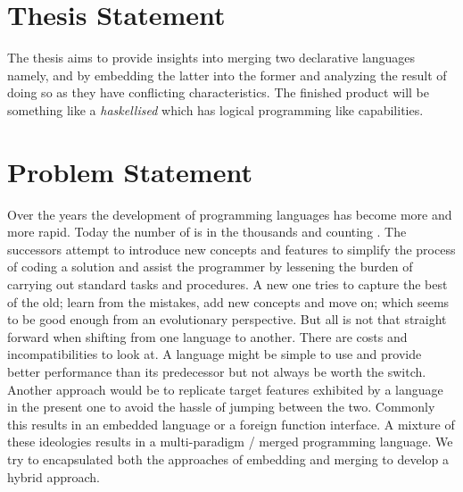 \documentclass[thesis-solanki.tex]{subfiles}
\begin{document}
\section{Thesis Statement}

The thesis aims to provide insights into merging two declarative languages namely,  and
 by embedding the latter into the former and analyzing the result of doing so as they have conflicting
characteristics.
The finished product will be something like a \textit{haskellised}  which has logical programming like
capabilities.


\section{Problem Statement}

Over the years the development of programming languages has become more and more rapid.
Today the number of is in the thousands and counting \cite{website:timelineproglangwiki,
  website:historyofproglang}.
The successors attempt to introduce new concepts and features to simplify the process of coding a solution and
assist the programmer by lessening the burden of carrying out standard tasks and procedures.
A new one tries to capture the best of the old; learn from the mistakes, add new concepts and move on; which seems
to be good enough from an evolutionary perspective.
But all is not that straight forward when shifting from one language to another.
There are costs and incompatibilities to look at.
A language might be simple to use and provide better performance than its predecessor but not always be worth the
switch.
Another approach would be to replicate target features exhibited by a language in the present one to avoid the
hassle of jumping between the two.
Commonly this results in an embedded language or a foreign function interface.
A mixture of these ideologies results in a multi-paradigm / merged programming language.
We try to encapsulated both the approaches of embedding and merging to develop a hybrid approach.
\end{document}
